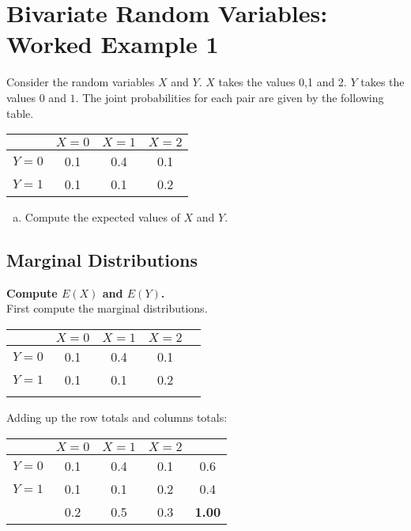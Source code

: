 \documentclass[a4paper,12pt]{article}
\begin{document}
\section*{Bivariate Random Variables: Worked Example 1}

Consider the random variables $X$ and $Y$. $X$ takes the values 0,1 and 2. $Y$ takes the values $0$ and $1$.
The joint probabilities for each pair are given by the following table.
\begin{center}
\begin{tabular}{|c|c|c|c|}
\hline  & $X=0$ & $X=1$ & $X=2$  \\ 
\hline $Y=0$ & 0.1  & 0.4 & 0.1 \\ 
\hline  $Y=1$ & 0.1 & 0.1 & 0.2 \\ 
\hline 
\end{tabular} 
\end{center}
\begin{enumerate}[(a)]
\item Compute the expected values of $X$ and $Y$.
\end{enumerate}





\subsection*{Marginal Distributions}

\textbf{Compute $E(X)$ and $E(Y)$.}\\
First compute the marginal distributions.

\begin{center}
\begin{tabular}{|c|c|c|c||c|}
\hline  & $X=0$ & $X=1$ & $X=2$  &\phantom{spaces}\\ 
\hline $Y=0$ & 0.1  & 0.4 & 0.1 &\\ 
\hline  $Y=1$ & 0.1 & 0.1 & 0.2 & \\ \hline
\hline & & & & \\
\hline 
\end{tabular} 
\end{center}

\noindent Adding up the row totals and columns totals:

\begin{center}
\begin{tabular}{|c|c|c|c||c|}
\hline  & $X=0$ & $X=1$ & $X=2$  &\phantom{spaces}\\ 
\hline $Y=0$ & 0.1  & 0.4 & 0.1 & 0.6\\ 
\hline  $Y=1$ & 0.1 & 0.1 & 0.2 & 0.4\\ \hline
\hline & 0.2& 0.5& 0.3& \textbf{1.00}\\
\hline 
\end{tabular} 
\end{center}
\end{document}
